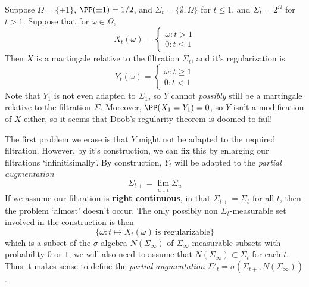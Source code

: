 \begin{example}
    Suppose $\Omega = \{ \pm 1 \}$, $\PP( \pm 1) = 1/2$, and $\Sigma_t = \{ \emptyset, \Omega \}$ for $t \leq 1$, and $\Sigma_t = 2^\Omega$ for $t > 1$. Suppose that for $\omega \in \Omega$,
    \[ X_t(\omega) = \begin{cases} \omega: t > 1 \\ 0 : t \leq 1 \end{cases} \]
    Then $X$ is a martingale relative to the filtration $\Sigma_t$, and it's regularization is
    \[ Y_t(\omega) = \begin{cases} \omega : t \geq 1 \\ 0 : t < 1 \end{cases} \]
    Note that $Y_1$ is not even adapted to $\Sigma_1$, so $Y$ cannot {\it possibly} still be a martingale relative to the filtration $\Sigma$. Moreover, $\PP(X_1 = Y_1) = 0$, so $Y$ isn't a modification of $X$ either, so it seems that Doob's regularity theorem is doomed to fail!
\end{example}

The first problem we erase is that $Y$ might not be adapted to the required filtration. However, by it's construction, we can fix this by enlarging our filtrations `infinitisimally'. By construction, $Y_t$ will be adapted to the {\it partial augmentation}
%
\[ \Sigma_{t+} = \lim_{u \downarrow t} \Sigma_u \]
%
If we assume our filtration is {\bf right continuous}, in that $\Sigma_{t+} = \Sigma_t$ for all $t$, then the problem `almost' doesn't occur. The only possibly non $\Sigma_t$-measurable set involved in the construction is then
%
\[ \{ \omega: t \mapsto X_t(\omega)\ \text{is regularizable} \} \]
%
which is a subset of the $\sigma$ algebra $N(\Sigma_\infty)$ of $\Sigma_\infty$ measurable subsets with probability $0$ or $1$, we will also need to assume that $N(\Sigma_\infty) \subset \Sigma_t$ for each $t$. Thus it makes sense to define the {\it partial augmentation} $\Sigma'_t = \sigma(\Sigma_{t+},N(\Sigma_\infty))$.

